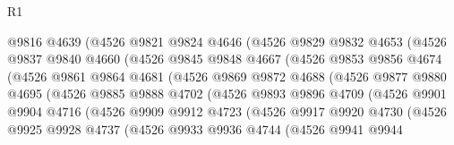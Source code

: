 \begin{lexlean}{R1}
\begin{coremodule}
                  @9816
                  @4639
                  (@4526
                    @9821
                    @9824
                    @4646
                    (@4526
                      @9829
                      @9832
                      @4653
                      (@4526
                        @9837
                        @9840
                        @4660
                        (@4526
                          @9845
                          @9848
                          @4667
                          (@4526
                            @9853
                            @9856
                            @4674
                            (@4526
                              @9861
                              @9864
                              @4681
                              (@4526
                                @9869
                                @9872
                                @4688
                                (@4526
                                  @9877
                                  @9880
                                  @4695
                                  (@4526
                                    @9885
                                    @9888
                                    @4702
                                    (@4526
                                      @9893
                                      @9896
                                      @4709
                                      (@4526
                                        @9901
                                        @9904
                                        @4716
                                        (@4526
                                          @9909
                                          @9912
                                          @4723
                                          (@4526
                                            @9917
                                            @9920
                                            @4730
                                            (@4526
                                              @9925
                                              @9928
                                              @4737
                                              (@4526
                                                @9933
                                                @9936
                                                @4744
                                                (@4526
                                                  @9941
                                                  @9944

\end{coremodule}
\end{lexlean}
